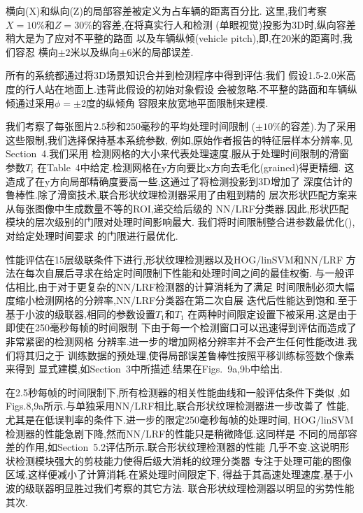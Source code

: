 \documentclass[10pt,letterpaper,journal,compsoc]{IEEEtran}
\begin{document}
横向(X)和纵向(Z)的局部容差被定义为占车辆的距离百分比.
这里,我们考察$X=10\%$和$Z=30\%$的容差,在将真实行人和检测
(单眼视觉)投影为3D时,纵向容差稍大是为了应对不平整的路面
以及车辆纵倾(vehicle pitch),即,在20米的距离时,我们容忍
横向$\pm2$米以及纵向$\pm6$米的局部误差.

所有的系统都通过将3D场景知识合并到检测程序中得到评估:我们
假设1.5-2.0米高度的行人站在地面上.违背此假设的初始对象假设
会被忽略.不平整的路面和车辆纵倾通过采用$\phi=\pm2$度的纵倾角
容限来放宽地平面限制来建模.

我们考察了每张图片$2.5$秒和$250$毫秒的平均处理时间限制
($\pm10\%$的容差).为了采用这些限制,我们选择保持基本系统参数,
例如,原始作者报告的特征层样本分辨率,见Section~4.我们采用
检测网格的大小来代表处理速度.服从于处理时间限制的滑窗参数$T_i$
在Table~4中给定.检测网格在y方向要比x方向去毛化(grained)得更精细.
这造成了在y方向局部精确度要高一些,这通过了将检测投影到3D增加了
深度估计的鲁棒性.除了滑窗技术,联合形状纹理检测器采用了由粗到精的
层次形状匹配方案来从每张图像中生成数量不等的ROI,递交给后级的
NN/LRF分类器.因此,形状匹配模块的层次级别的门限对处理时间影响最大.
我们将时间限制整合进参数最优化(\cite{bib23}),对给定处理时间要求
的门限进行最优化.

性能评估在15层级联条件下进行,形状纹理检测器以及HOG/linSVM和NN/LRF
方法在每次自展后寻求在给定时间限制下性能和处理时间之间的最佳权衡.
与一般评估相比,由于对于更复杂的NN/LRF检测器的计算消耗为了满足
时间限制必须大幅度缩小检测网格的分辨率,NN/LRF分类器在第二次自展
迭代后性能达到饱和.至于基于小波的级联器,相同的参数设置$T_1$和$T_1$
在两种时间限定设置下被采用.这是由于即使在250毫秒每帧的时间限制
下由于每一个检测窗口可以迅速得到评估而造成了非常紧密的检测网格
分辨率.进一步的增加网格分辨率并不会产生任何性能改进.我们将其归之于
训练数据的预处理,使得局部误差鲁棒性按照平移训练标签数个像素来得到
显式建模,如Section~3中所描述.结果在Figs.~9a,9b中给出.

在2.5秒每帧的时间限制下,所有检测器的相关性能曲线和一般评估条件下类似
,如Figs.8,9a所示.与单独采用NN/LRF相比,联合形状纹理检测器进一步改善了
性能,尤其是在低误判率的条件下.进一步的限定250毫秒每帧的处理时间,
HOG/linSVM检测器的性能急剧下降,然而NN/LRF的性能只是稍微降低.这同样是
不同的局部容差的作用,如Section~5.2评估所示.联合形状纹理检测器的性能
几乎不变.这说明形状检测模块强大的剪枝能力使得后级大消耗的纹理分类器
专注于处理可能的图像区域,这样便减小了计算消耗.在紧处理时间限定下,
得益于其高速处理速度,基于小波的级联器明显胜过我们考察的其它方法.
联合形状纹理检测器以明显的劣势性能其次.
\end{document}
